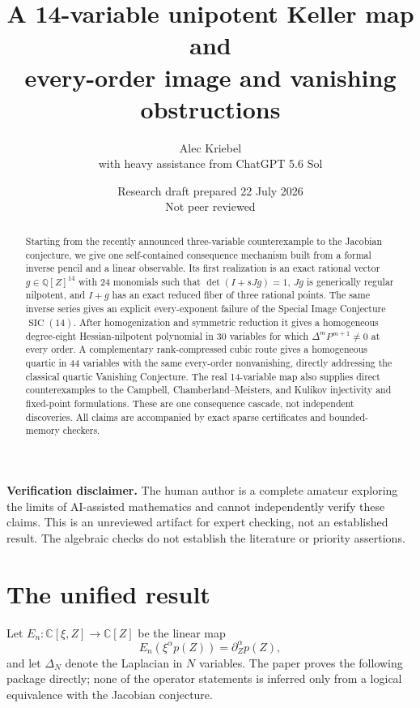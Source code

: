 \documentclass[11pt]{article}
\title{A 14-variable unipotent Keller map and\\
every-order image and vanishing obstructions}
\author{Alec Kriebel\\[2pt]\large with heavy assistance from ChatGPT 5.6 Sol}
\date{Research draft prepared 22 July 2026\\Not peer reviewed}
\newcommand{\C}{\mathbb C}
\newcommand{\Q}{\mathbb Q}
\newcommand{\SIC}{\operatorname{SIC}}
\begin{document}
\maketitle

\begin{abstract}
Starting from the recently announced three-variable counterexample to the
Jacobian conjecture, we give one self-contained consequence mechanism built
from a formal inverse pencil and a linear observable.  Its first realization
is an exact rational vector $g\in\Q[Z]^{14}$ with 24 monomials such that
$\det(I+sJg)=1$, $Jg$ is generically regular nilpotent, and $I+g$ has an exact
reduced fiber of three rational points.  The same inverse series gives an
explicit every-exponent failure of the Special Image Conjecture $\SIC(14)$.
After homogenization and symmetric reduction it gives a homogeneous
degree-eight Hessian-nilpotent polynomial in 30 variables for which
$\Delta^mP^{m+1}\ne0$ at every order.  A complementary rank-compressed cubic
route gives a homogeneous quartic in 44 variables with the same every-order
nonvanishing, directly addressing the classical quartic Vanishing
Conjecture.  The real 14-variable map also supplies direct counterexamples to
the Campbell, Chamberland--Meisters, and Kulikov injectivity and fixed-point
formulations.  These are one consequence cascade, not independent
discoveries.  All claims are accompanied by exact sparse certificates and
bounded-memory checkers.
\end{abstract}

\noindent\textbf{Verification disclaimer.}
The human author is a complete amateur exploring the limits of AI-assisted
mathematics and cannot independently verify these claims.  This is an
unreviewed artifact for expert checking, not an established result.  The
algebraic checks do not establish the literature or priority assertions.

\section{The unified result}

Let $E_n:\C[\xi,Z]\to\C[Z]$ be the linear map
\begin{equation}
 E_n(\xi^\alpha p(Z))=\partial_Z^\alpha p(Z),
 \label{eq:E}
\end{equation}
and let $\Delta_N$ denote the Laplacian in $N$ variables.  The paper proves
the following package directly; none of the operator statements is inferred
only from a logical equivalence with the Jacobian conjecture.
\end{document}
